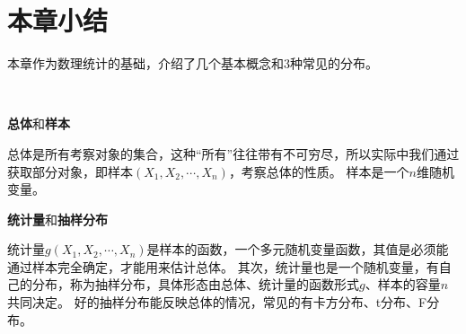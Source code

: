 \section{本章小结}

本章作为数理统计的基础，介绍了几个基本概念和3种常见的分布。

~

{\bf 总体}和{\bf 样本}

总体是所有考察对象的集合，这种“所有”往往带有不可穷尽，所以实际中我们通过获取部分对象，即样本$\left( X_1,X_2,\cdots ,X_n \right) $，考察总体的性质。
样本是一个$n$维随机变量。

{\bf 统计量}和{\bf 抽样分布}

统计量$g\left( X_1,X_2,\cdots ,X_n \right) $是样本的函数，一个多元随机变量函数，其值是必须能通过样本完全确定，才能用来估计总体。
其次，统计量也是一个随机变量，有自己的分布，称为抽样分布，具体形态由总体、统计量的函数形式$g$、样本的容量$n$共同决定。
好的抽样分布能反映总体的情况，常见的有卡方分布、t分布、F分布。




